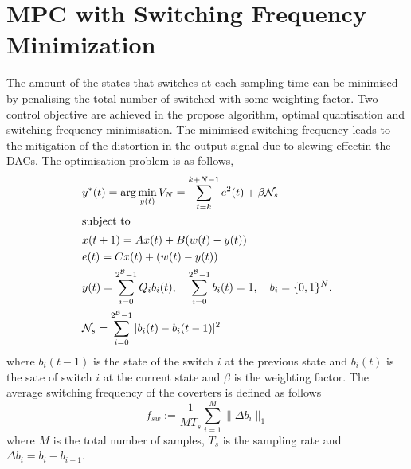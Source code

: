 \documentclass[a4paper]{article}
\begin{document}
\section{MPC with Switching Frequency Minimization}
The  amount of the states that switches at each sampling time can be minimised by penalising the total number of switched with some weighting factor.  Two control objective are achieved in the propose algorithm, optimal quantisation and switching frequency minimisation. The minimised switching frequency leads to the mitigation of the distortion in the output signal due to slewing effectin the DACs.   The optimisation problem is as follows,  
\begin{align}
		& y^{\ast}(t) = \arg  \min_{y(t) }	V_{N}  = \sum_{t=k}^{k+N-1} e^{2}(t) + \beta \mathcal{N}_{s}\label{eq:optobj121}\\
		\intertext{subject to}
		&x(t+1) = A x(t) + B (w(t)-y(t))	\label{eq:optconst122}	\\
		&e(t) = Cx(t) + (w(t)-y(t))	\label{eq:optconst223}	\\
		&y(t) = \sum_{i = 0}^{2^{\mathcal{B}}-1} Q_{i}b_{i}(t), \quad \sum_{i = 0}^{2^{\mathcal{B}}-1}b_{i}(t)  =1, \quad b_{i} = \{0,1\}^{N}. \label{eq:optconst324} \\
		&\mathcal{N}_{s} = \sum_{i = 0}^{2^{\mathcal{B}}-1} |b_{i}(t) - b_{i}(t-1)|^{2}
	\end{align}
	where $b_{i}(t-1)$ is the state of the switch $i$ at the previous state and $b_{i}(t)$ is the sate of switch $i$ at the current state and $\beta$ is the weighting factor.  The average switching frequency of the coverters is defined as follows 
	\begin{equation}
		f_{sw} :=  \frac{1}{M T_{s}} \sum_{i = 1}^{M} \|\Delta b_{i}\|_{1}
	\end{equation}
	where $M$ is the total number of samples, $T_{s}$ is the sampling rate and $\Delta b_{i} = b_{i} - b_{i-1}$.

\end{document}
